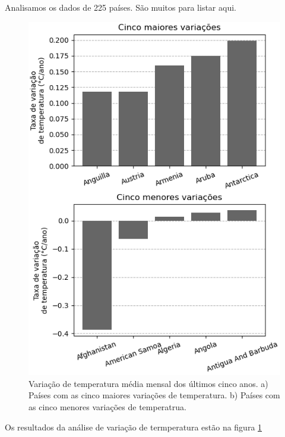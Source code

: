 \documentclass{article}
\begin{document}
Analisamos os dados de 225 países. São muitos para listar aqui.

\begin{figure}
	\includegraphics{../figuras/variacao_temperatura.png}
	\caption{
	Variação de temperatura média mensal dos últimos cinco anos.
	a) Países com as cinco maiores variações de temperatura.
	b) Países com as cinco menores variações de temperatrua.	
	}
	\label{fig:variacao}
\end{figure}

Os resultados da análise de variação de termperatura estão na figura \ref{fig:variacao}



\end{document}
